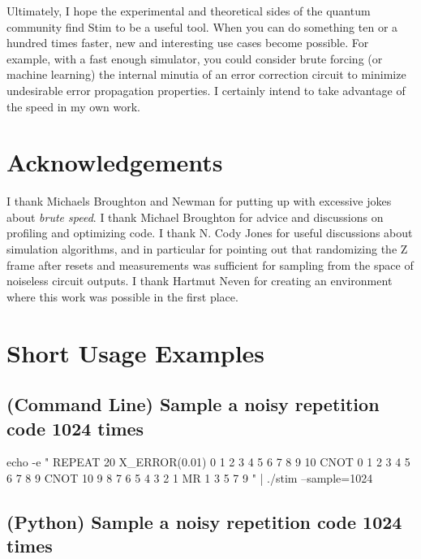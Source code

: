 \documentclass[onecolumn,unpublished]{quantumarticle}
\theoremstyle{definition}
\theoremstyle{definition}
\theoremstyle{definition}
\begin{document}
Ultimately, I hope the experimental and theoretical sides of the quantum community find Stim to be a useful tool.
When you can do something ten or a hundred times faster, new and interesting use cases become possible.
For example, with a fast enough simulator, you could consider brute forcing (or machine learning) the internal minutia of an error correction circuit to minimize undesirable error propagation properties.
I certainly intend to take advantage of the speed in my own work.


\section{Acknowledgements}

I thank Michaels Broughton and Newman for putting up with excessive jokes about {\em brute speed}.
I thank Michael Broughton for advice and discussions on profiling and optimizing code.
I thank N. Cody Jones for useful discussions about simulation algorithms, and in particular for pointing out that randomizing the Z frame after resets and measurements was sufficient for sampling from the space of noiseless circuit outputs.
I thank Hartmut Neven for creating an environment where this work was possible in the first place.





\appendix

\section{Short Usage Examples}
\label{app:example}

\subsection{(Command Line) Sample a noisy repetition code 1024 times}

\begin{python}
    echo -e "
        REPEAT 20 {\n
            X_ERROR(0.01) 0 1 2 3 4 5 6 7 8 9 10\n
            CNOT 0 1 2 3 4 5 6 7 8 9\n
            CNOT 10 9 8 7 6 5 4 3 2 1\n
            MR 1 3 5 7 9\n
        }
    " | ./stim --sample=1024
\end{python}

\subsection{(Python) Sample a noisy repetition code 1024 times}
\end{document}
